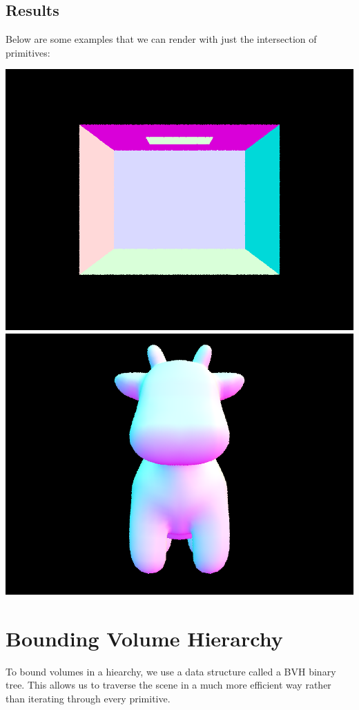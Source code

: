 \documentclass{article}
\begin{document}
\subsection{Results}
Below are some examples that we can render with just the intersection of primitives:
\begin{center}
    \includegraphics[width=\textwidth]{Task 1/CBempty.png}
    \includegraphics[width=\textwidth]{Task 1/cow.png}
\end{center}
\newpage
\section{Bounding Volume Hierarchy}
To bound volumes in a hiearchy, we use a data structure called a BVH binary tree. This allows us to traverse the scene in a much more efficient way rather than iterating through every primitive.
\end{document}
